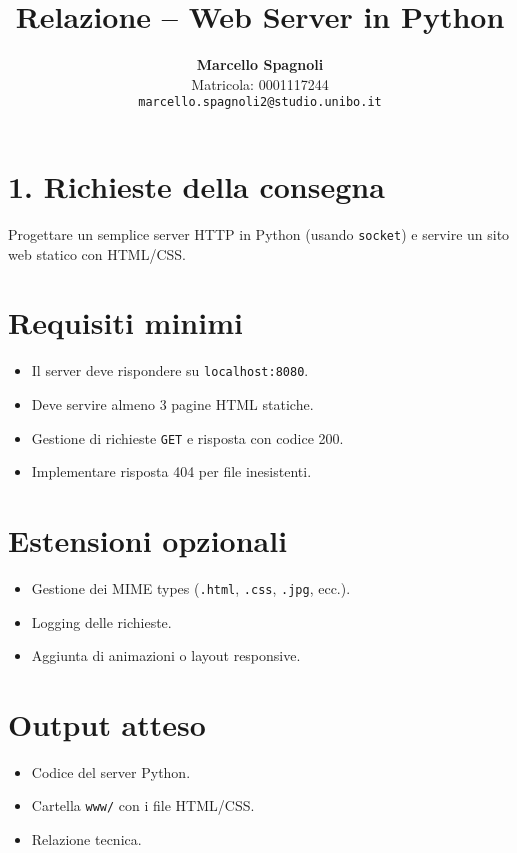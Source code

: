 \documentclass[a4paper,11pt]{article}
\title{Relazione – Web Server in Python}
\author{\textbf{Marcello Spagnoli}\\
Matricola: 0001117244\\
\texttt{marcello.spagnoli2@studio.unibo.it}}
\begin{document}
\maketitle

\section*{1. Richieste della consegna}
Progettare un semplice server HTTP in Python (usando \texttt{socket}) e servire un sito web statico con HTML/CSS.

\section*{Requisiti minimi}
\begin{itemize}
  \item Il server deve rispondere su \texttt{localhost:8080}.
  \item Deve servire almeno 3 pagine HTML statiche.
  \item Gestione di richieste \texttt{GET} e risposta con codice 200.
  \item Implementare risposta 404 per file inesistenti.
\end{itemize}

\section*{Estensioni opzionali}
\begin{itemize}
  \item Gestione dei MIME types (\texttt{.html}, \texttt{.css}, \texttt{.jpg}, ecc.).
  \item Logging delle richieste.
  \item Aggiunta di animazioni o layout responsive.
\end{itemize}

\section*{Output atteso}
\begin{itemize}
  \item Codice del server Python.
  \item Cartella \texttt{www/} con i file HTML/CSS.
  \item Relazione tecnica.
\end{itemize}
\end{document}
